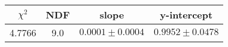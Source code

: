 \begin{tabular}{|c|c|c|c|}

\hline
$\chi^{2}$ & NDF & slope & y-intercept  \\
\hline
4.7766 & 9.0 & $0.0001\pm0.0004$ & $0.9952\pm0.0478$ \\
\hline

\end{tabular}